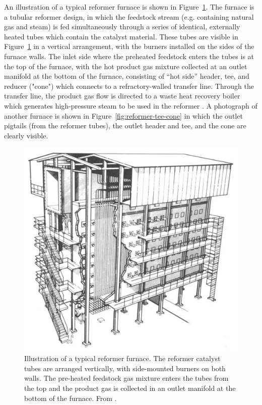 An illustration of a typical reformer furnace is shown in Figure~\ref{fig:reformer-furnace}. The furnace is a tubular reformer design, in which the feedstock stream (e.g. containing natural gas and steam) is fed simultaneously through a series of identical, externally heated tubes which contain the catalyst material. These tubes are visible in Figure~\ref{fig:reformer-furnace} in a vertical arrangement, with the burners installed on the sides of the furnace walls. The inlet side where the preheated feedstock enters the tubes is at the top of the furnace, with the hot product gas mixture collected at an outlet manifold at the bottom of the furnace, consisting of ``hot side'' header, tee, and reducer ("cone") which connects to a refractory-walled transfer line. Through the transfer line, the product gas flow is directed to a waste heat recovery boiler which generates high-pressure steam to be used in the reformer \cite{rostrup-nielsen_catalytic_1984}. A photograph of another furnace is shown in Figure~\ref{fig:reformer-tee-cone} \cite{penso_repair_2006} in which the outlet pigtails (from the reformer tubes), the outlet header and tee, and the cone are clearly visible.

\begin{figure}[h]
\centering
\includegraphics{figures/reformer-furnace}
\caption[Illustration of a typical reformer furnace.]{Illustration of a typical reformer furnace. The reformer catalyst tubes are arranged vertically, with side-mounted burners on both walls. The pre-heated feedstock gas mixture enters the tubes from the top and the product gas is collected in an outlet manifold at the bottom of the furnace.  From \citet[Fig.~9]{rostrup-nielsen_catalytic_1984}.}
\label{fig:reformer-furnace}
\end{figure}

